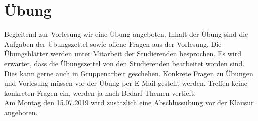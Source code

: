 \section{Übung}
Begleitend zur Vorlesung wir eine Übung angeboten. Inhalt der Übung sind die Aufgaben der Übungszettel sowie offene Fragen aus der Vorlesung. Die Übungsblätter werden unter Mitarbeit der Studierenden besprochen. Es wird erwartet, dass die Übungszettel von den Studierenden bearbeitet worden sind. Dies kann gerne auch in Gruppenarbeit geschehen. Konkrete Fragen zu Übungen und Vorlesung müssen vor der Übung per E-Mail  gestellt werden. Treffen keine konkreten Fragen ein, werden ja nach Bedarf Themen vertieft.\\
\noindent
Am Montag den 15.07.2019 wird zusätzlich eine Abschlussübung vor der Klausur angeboten.